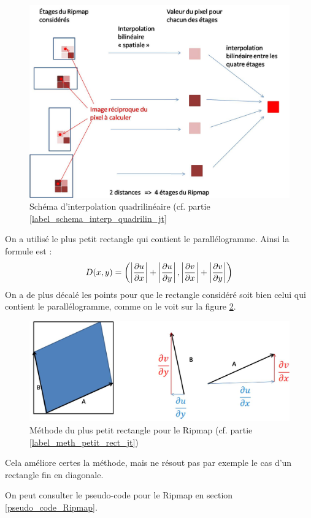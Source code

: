 \label{label_schema_interp_quadrilin_jt}
\begin{figure}[h!]
\centering
\includegraphics[scale=0.5]{interbibilineaire.jpg}
\caption{Schéma d'interpolation quadrilinéaire (cf. partie \ref{label_schema_interp_quadrilin_jt}}
\label{interbibilineaire}
\end{figure}


On a utilisé le plus petit rectangle qui contient le parallélogramme. Ainsi la formule est :
$$D(x,y) = \left( \left|\frac{\partial u}{\partial x}\right|+\left|\frac{\partial u}{\partial y}\right|,\left|\frac{\partial v}{\partial x}\right|+\left|\frac{\partial v}{\partial y}\right|\right)$$
On a de plus décalé les points pour que le rectangle considéré soit bien celui qui contient le parallélogramme, comme on le voit sur la figure \ref{methode_distance_ripmap}.
\label{label_meth_petit_rect_jt}
\begin{figure}[h!]
\centering
\includegraphics[scale=0.5]{methode_distance_ripmap.jpg}
\caption{Méthode du plus petit rectangle pour le Ripmap (cf. partie \ref{label_meth_petit_rect_jt})}
\label{methode_distance_ripmap}
\end{figure}

Cela améliore certes la méthode, mais ne résout pas par exemple le cas d'un rectangle fin en diagonale.

On peut consulter le pseudo-code pour le Ripmap en section \ref{pseudo_code_Ripmap}.
